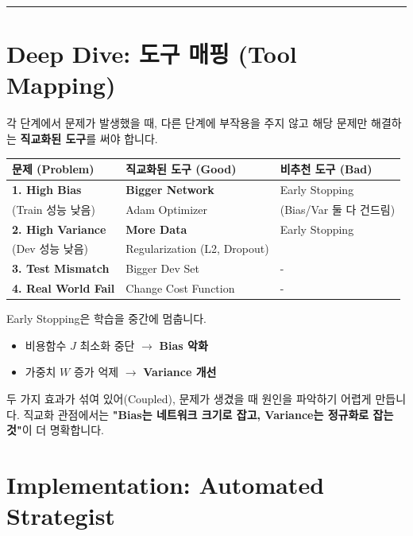 \documentclass[11pt,a4paper]{book}
\theoremstyle{definition}
\begin{document}
\vspace{0.5cm}\hrule\vspace{0.5cm}

\section{Deep Dive: 도구 매핑 (Tool Mapping)}

각 단계에서 문제가 발생했을 때, 다른 단계에 부작용을 주지 않고 해당 문제만 해결하는 \textbf{직교화된 도구}를 써야 합니다.

\begin{strategybox}[title={Dr. Ng's Prescription Table}]
\begin{center}
\begin{tabular}{l|l|l}
\hline
\textbf{문제 (Problem)} & \textbf{직교화된 도구 (Good)} & \textbf{비추천 도구 (Bad)} \\ \hline
\textbf{1. High Bias} & \textbf{Bigger Network} & Early Stopping \\
(Train 성능 낮음) & Adam Optimizer & (Bias/Var 둘 다 건드림) \\ \hline
\textbf{2. High Variance} & \textbf{More Data} & Early Stopping \\
(Dev 성능 낮음) & Regularization (L2, Dropout) & \\ \hline
\textbf{3. Test Mismatch} & Bigger Dev Set & - \\ \hline
\textbf{4. Real World Fail} & Change Cost Function & - \\ \hline
\end{tabular}
\end{center}
\end{strategybox}

\begin{warningbox}[title={Early Stopping의 딜레마}]
Early Stopping은 학습을 중간에 멈춥니다.
\begin{itemize}
    \item 비용함수 $J$ 최소화 중단 $\rightarrow$ \textbf{Bias 악화}
    \item 가중치 $W$ 증가 억제 $\rightarrow$ \textbf{Variance 개선}
\end{itemize}
두 가지 효과가 섞여 있어(Coupled), 문제가 생겼을 때 원인을 파악하기 어렵게 만듭니다. 직교화 관점에서는 \textbf{"Bias는 네트워크 크기로 잡고, Variance는 정규화로 잡는 것"}이 더 명확합니다.
\end{warningbox}

\section{Implementation: Automated Strategist}
\end{document}

